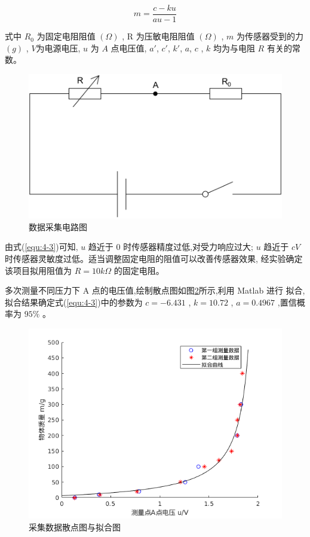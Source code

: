 \begin{equation}
  \label{equ:4-3}
  m = \frac{{c - ku}}{{au - 1}}
\end{equation}

式中 $R_0$ 为固定电阻阻值 $(\Omega )$ , R 为压敏电阻阻值 $(\Omega )$ ,
$m$ 为传感器受到的力 $(g)$ , $V$为电源电压, $u$ 为 $A$ 点电压值,
$a'$, $c'$, $k'$, $a$, $c$ , $k$ 均为与电阻 $R$ 有关的常数。

\begin{figure}[!ht]
  \centering
  \includegraphics[scale=0.4]{chapter04/pic/4-3}
  \caption{数据采集电路图}
  \label{fig:4-3}
  \vspace{-0.3cm}
\end{figure}

由式(\ref{equ:4-3})可知, $u$ 趋近于 0 时传感器精度过低,对受力响应过大;
$u$ 趋近于 $cV$ 时传感器灵敏度过低。适当调整固定电阻的阻值可以改善传感器效果,
经实验确定该项目拟用阻值为 $R=10k\Omega$ 的固定电阻。

多次测量不同压力下 A 点的电压值,绘制散点图如图\ref{fig:4-4}所示,利用 Matlab 进行
拟合,拟合结果确定式(\ref{equ:4-3})中的参数为
$c = − 6.431$ , $ k = 10.72 $ , $a = 0.4967$ ,置信概率为 $95\%$ 。

\begin{figure}[!ht]
  \centering
  \includegraphics[width=13.5cm]{chapter04/pic/4-4}
  \caption{采集数据散点图与拟合图}
  \label{fig:4-4}
  \vspace{-0.3cm}
\end{figure}

